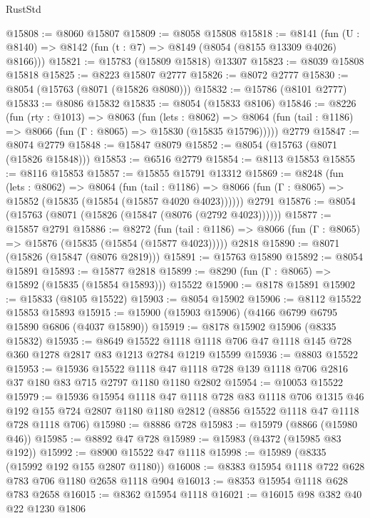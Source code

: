 \begin{lexlean}{RustStd}
\begin{coremodule}
@15808 := @8060 @15807
@15809 := @8058 @15808
@15818 := @8141
    (fun (U : @8140) => @8142 (fun (t : @7) => @8149 (@8054 (@8155 @13309 @4026) @8166)))
@15821 := @15783 (@15809 @15818) @13307
@15823 := @8039 @15808 @15818
@15825 := @8223 @15807 @2777
@15826 := @8072 @2777
@15830 := @8054 (@15763 (@8071 (@15826 @8080)))
@15832 := @15786 (@8101 @2777)
@15833 := @8086 @15832
@15835 := @8054 (@15833 @8106)
@15846 := @8226
    (fun (rty : @1013) =>
    @8063
      (fun (lets : @8062) =>
      @8064 (fun (tail : @1186) => @8066 (fun (Γ : @8065) => @15830 (@15835 @15796)))))
    @2779
@15847 := @8074 @2779
@15848 := @15847 @8079
@15852 := @8054 (@15763 (@8071 (@15826 @15848)))
@15853 := @6516 @2779
@15854 := @8113 @15853
@15855 := @8116 @15853
@15857 := @15855 @15791 @13312
@15869 := @8248
    (fun (lets : @8062) =>
    @8064
      (fun (tail : @1186) =>
      @8066 (fun (Γ : @8065) => @15852 (@15835 (@15854 (@15857 @4020 @4023))))))
    @2791
@15876 := @8054 (@15763 (@8071 (@15826 (@15847 (@8076 (@2792 @4023))))))
@15877 := @15857 @2791
@15886 := @8272
    (fun (tail : @1186) => @8066 (fun (Γ : @8065) => @15876 (@15835 (@15854 (@15877 @4023)))))
    @2818
@15890 := @8071 (@15826 (@15847 (@8076 @2819)))
@15891 := @15763 @15890
@15892 := @8054 @15891
@15893 := @15877 @2818
@15899 := @8290 (fun (Γ : @8065) => @15892 (@15835 (@15854 @15893))) @15522
@15900 := @8178 @15891
@15902 := @15833 (@8105 @15522)
@15903 := @8054 @15902
@15906 := @8112 @15522 @15853 @15893
@15915 := @15900 (@15903 @15906) (@4166 @6799 @6795 @15890 @6806 (@4037 @15890))
@15919 := @8178 @15902 @15906 (@8335 @15832)
@15935 := @8649
    @15522
    @1118
    @1118
    @706
    @47
    @1118
    @145
    @728
    @360
    @1278
    @2817
    @83
    @1213
    @2784
    @1219
    @15599
@15936 := @8803 @15522
@15953 := @15936
    @15522
    @1118
    @47
    @1118
    @728
    @139
    @1118
    @706
    @2816
    @37
    @180
    @83
    @715
    @2797
    @1180
    @1180
    @2802
@15954 := @10053 @15522
@15979 := @15936
    @15954
    @1118
    @47
    @1118
    @728
    @83
    @1118
    @706
    @1315
    @46
    @192
    @155
    @724
    @2807
    @1180
    @1180
    @2812
    (@8856 @15522 @1118 @47 @1118 @728 @1118 @706)
@15980 := @8886 @728
@15983 := @15979 (@8866 (@15980 @46))
@15985 := @8892 @47 @728
@15989 := @15983 (@4372 (@15985 @83 @192))
@15992 := @8900 @15522 @47 @1118
@15998 := @15989 (@8335 (@15992 @192 @155 @2807 @1180))
@16008 := @8383 @15954 @1118 @722 @628 @783 @706 @1180 @2658 @1118 @904
@16013 := @8353 @15954 @1118 @628 @783 @2658
@16015 := @8362 @15954 @1118
@16021 := @16015 @98 @382 @40 @22 @1230 @1806

\end{coremodule}
\end{lexlean}
